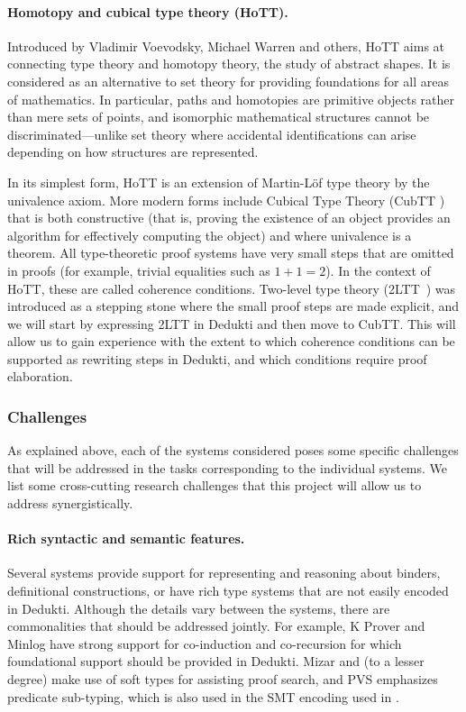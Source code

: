\paragraph*{Homotopy and cubical type theory (HoTT).}
Introduced by Vladimir Voevodsky, Michael Warren and others, HoTT aims at
connecting type theory and homotopy theory, the study of abstract shapes. It is
considered as an alternative to set theory for providing foundations for all
areas of mathematics. In particular, paths and homotopies are primitive objects
rather than mere sets of points, and isomorphic mathematical structures cannot
be discriminated---unlike set theory where accidental identifications can arise
depending on how structures are represented.

In its simplest form, HoTT is an extension of Martin-L\"of type theory by the
univalence axiom. More modern forms include Cubical Type Theory (CubTT
\cite{cohen:cubical}) that is both constructive (that is, proving the existence of
an object provides an algorithm for effectively computing the object) and where
univalence is a theorem. All type-theoretic proof systems have very small steps
that are omitted in proofs (for example, trivial equalities such as $1+1=2$). In the
context of HoTT, these are called coherence conditions. Two-level type theory
(2LTT~\cite{annenkov:two-level}) was introduced as a stepping stone where the
small proof steps are made explicit, and we will start by expressing 2LTT in
Dedukti and then move to CubTT. This will allow us to gain experience with
the extent to which coherence conditions can be supported as rewriting steps in
Dedukti, and which conditions require proof elaboration.

\subsubsection*{Challenges}

As explained above, each of the systems considered poses some specific
challenges that will be addressed in the tasks corresponding to the
individual systems. We list some cross-cutting research challenges
that this project will allow us to address synergistically.

\paragraph*{Rich syntactic and semantic features.}
Several systems provide support for representing and reasoning about
binders, definitional constructions, or have rich type systems that
are not easily encoded in Dedukti.  Although the details vary between the systems,
there are commonalities that should be addressed jointly. For example,
K Prover and Minlog have strong support for co-induction and co-recursion
for which foundational support should be provided in Dedukti. Mizar
and (to a lesser degree) \tlaplus make use of soft types for assisting
proof search, and PVS emphasizes predicate sub-typing, which is also
used in the SMT encoding used in \tlaplus.

